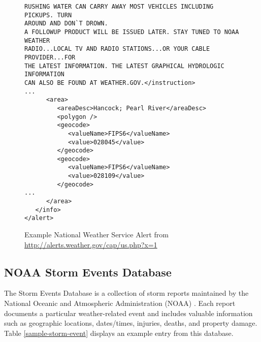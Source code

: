 \documentclass{article}
\begin{document}
\begin{figure*}[t!]
\begin{center}
\begin{lstlisting}
RUSHING WATER CAN CARRY AWAY MOST VEHICLES INCLUDING PICKUPS. TURN
AROUND AND DON`T DROWN.
A FOLLOWUP PRODUCT WILL BE ISSUED LATER. STAY TUNED TO NOAA WEATHER
RADIO...LOCAL TV AND RADIO STATIONS...OR YOUR CABLE PROVIDER...FOR
THE LATEST INFORMATION. THE LATEST GRAPHICAL HYDROLOGIC INFORMATION
CAN ALSO BE FOUND AT WEATHER.GOV.</instruction>
...
      <area>
         <areaDesc>Hancock; Pearl River</areaDesc>
         <polygon />
         <geocode>
            <valueName>FIPS6</valueName>
            <value>028045</value>
         </geocode>
         <geocode>
            <valueName>FIPS6</valueName>
            <value>028109</value>
         </geocode>
...
      </area>
   </info>
</alert>
\end{lstlisting}
\caption{Example National Weather Service Alert from \url{http://alerts.weather.gov/cap/us.php?x=1}}
\label{example-alert}
\end{center}
\vskip -0.2in
\end{figure*} 

\subsection{NOAA Storm Events Database}

The Storm Events Database is a collection of storm reports maintained by the National Oceanic and Atmospheric Administration (NOAA) \cite{stormevents}. Each report documents a particular weather-related event and includes valuable information such as geographic locations, dates/times, injuries, deaths, and property damage. Table \ref{sample-storm-event} displays an example entry from this database.
\end{document}
